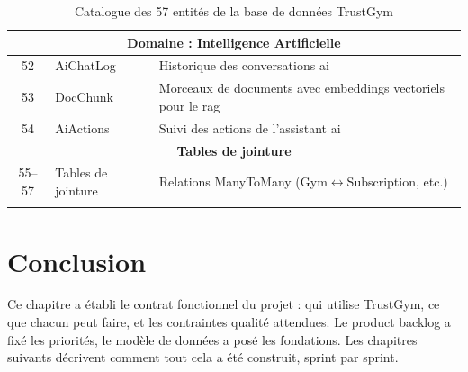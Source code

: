 \documentclass[../main.tex]{subfiles}
\begin{document}
\begin{longtable}{|c|>{\footnotesize}p{4.8cm}|p{7.5cm}|}
\multicolumn{3}{|c|}{\textbf{Domaine : Intelligence Artificielle}} \\
\hline
52 & AiChatLog & Historique des conversations \acrshort{ai} \\
\hline
53 & DocChunk & Morceaux de documents avec embeddings vectoriels pour le \acrshort{rag} \\
\hline
54 & AiActions & Suivi des actions de l'assistant \acrshort{ai} \\
\hline

\multicolumn{3}{|c|}{\textbf{Tables de jointure}} \\
\hline
55--57 & Tables de jointure & Relations ManyToMany (Gym$\leftrightarrow$Subscription, etc.) \\
\hline

\caption{Catalogue des 57 entit\'{e}s de la base de donn\'{e}es TrustGym}
\label{tab:entity_catalog}
\end{longtable}

\section{Conclusion}
Ce chapitre a \'{e}tabli le contrat fonctionnel du projet : qui utilise TrustGym, ce que chacun peut faire, et les contraintes qualit\'{e} attendues. Le product backlog a fix\'{e} les priorit\'{e}s, le mod\`{e}le de donn\'{e}es a pos\'{e} les fondations. Les chapitres suivants d\'{e}crivent comment tout cela a \'{e}t\'{e} construit, sprint par sprint.
\end{document}
